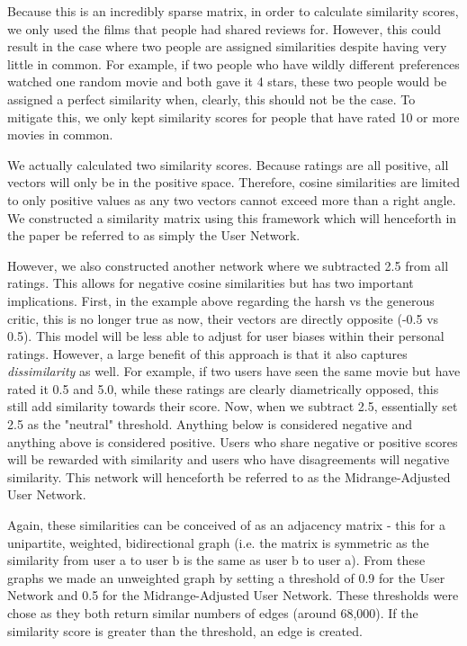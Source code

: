 \documentclass[12pt]{article}
\numberwithin{equation}{section}
\begin{document}
Because this is an incredibly sparse matrix, in order to calculate similarity scores, we only used the films that people had shared reviews for. However, this could result in the case where two people are assigned similarities despite having very little in common. For example, if two people who have wildly different preferences watched one random movie and both gave it 4 stars, these two people would be assigned a perfect similarity when, clearly, this should not be the case. To mitigate this, we only kept similarity scores for people that have rated 10 or more movies in common.

We actually calculated two similarity scores. Because ratings are all positive, all vectors will only be in the positive space. Therefore, cosine similarities are limited to only positive values as any two vectors cannot exceed more than a right angle. We constructed a similarity matrix using this framework which will henceforth in the paper be referred to as simply the User Network.

However, we also constructed another network where we subtracted 2.5 from all ratings. This allows for negative cosine similarities but has two important implications. First, in the example above regarding the harsh vs the generous critic, this is no longer true as now, their vectors are directly opposite (-0.5 vs 0.5). This model will be less able to adjust for user biases within their personal ratings. However, a large benefit of this approach is that it also captures \textit{dissimilarity} as well. For example, if two users have seen the same movie but have rated it 0.5 and 5.0, while these ratings are clearly diametrically opposed, this still add similarity towards their score. Now, when we subtract 2.5, essentially set 2.5 as the "neutral" threshold. Anything below is considered negative and anything above is considered positive. Users who share negative or positive scores will be rewarded with similarity and users who have disagreements will negative similarity. This network will henceforth be referred to as the Midrange-Adjusted User Network.

Again, these similarities can be conceived of as an adjacency matrix - this for a unipartite, weighted, bidirectional graph (i.e. the matrix is symmetric as the similarity from user a to user b is the same as user b to user a). From these graphs we made an unweighted graph by setting a threshold of 0.9 for the User Network and 0.5 for the Midrange-Adjusted User Network. These thresholds were chose as they both return similar numbers of edges (around 68,000). If the similarity score is greater than the threshold, an edge is created.
\end{document}
